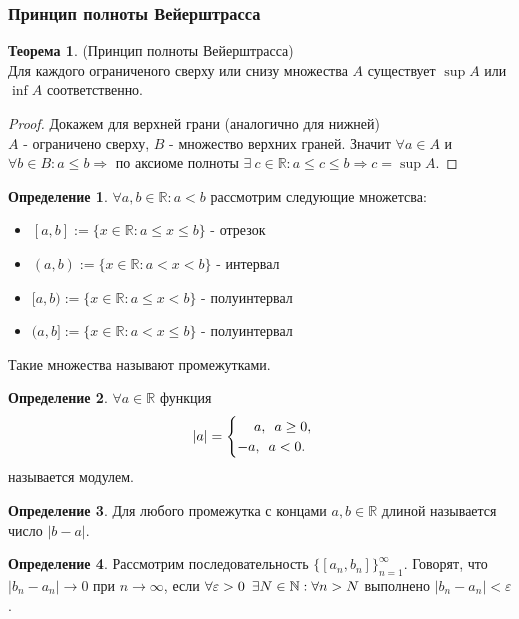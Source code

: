 \documentclass[a4paper, 12pt]{article}
\newcommand{\N}{\mathbb{N}}
\newcommand{\R}{\mathbb{R}}
\renewcommand{\epsilon}{\varepsilon}
\newcommand\tab[1][.5cm]{\hspace*{#1}}
\theoremstyle{definition}
\newtheorem*{definition}{Определение}
\newtheorem*{theorem}{Теорема}
\begin{document}
        \subsubsection{Принцип полноты Вейерштрасса}
        \begin{theorem} (Принцип полноты Вейерштрасса) \\
            Для каждого ограниченого сверху или снизу множества $A$ существует $\sup A$ или $\inf A$ соответственно.
        \end{theorem}
        \begin{proof}
            Докажем для верхней грани (аналогично для нижней)\\
            $A$ - ограничено сверху, $B$ - множество верхних граней. Значит $\forall a\in A$ и \\$\forall b\in B: a\leq b \Rightarrow$ по аксиоме полноты $\exists\ c\in \R: a\leq c\leq b \Rightarrow c=\sup A$.
        \end{proof}\newpage
        \begin{definition}
            $\forall a,b\in \R: a<b$ рассмотрим следующие множетсва:
            \begin{itemize}
                \item $[a,b] := \{x\in \R: a\leq x\leq b\}$ - отрезок
                \item $(a,b) := \{x\in \R: a<x<b\}$ - интервал
                \item $[a,b) := \{x\in \R: a\leq x<b\}$ - полуинтервал
                \item $(a,b] := \{x\in \R: a<x\leq b\}$ - полуинтервал
            \end{itemize}
            Такие множества называют промежутками.
        \end{definition} 
        \begin{definition}
            $\forall a\in \R$ функция
            \[|a|=
                \begin{cases}
                    \tab[12pt]a, \tab[5pt] a\geq 0,\\
                    -a, \tab[5pt] a<0.
                \end{cases}\]
            называется модулем.
        \end{definition}
        \begin{definition}
            Для любого промежутка с концами $a,b\in \R$ длиной называется число $|b-a|$.
        \end{definition}
        \begin{definition}
            Рассмотрим последовательность $\{[a_n,b_n]\}_{n=1}^{\infty}$. Говорят, что\\ $|b_n-a_n|\to 0$ при $n\to \infty$, если $\forall \epsilon >0\tab[5pt]\exists N\in \N: \forall n>N$ выполнено $|b_n-a_n|<\epsilon$.
        \end{definition}
\end{document}
